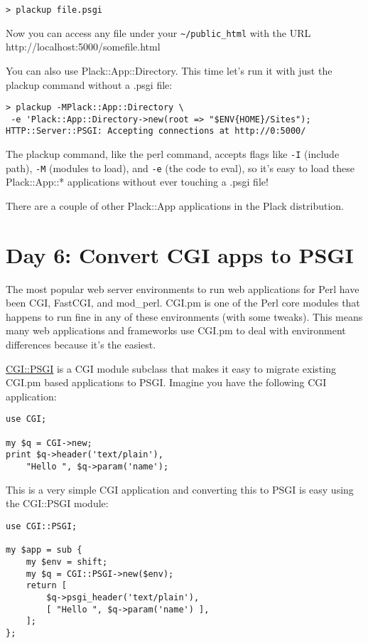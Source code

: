 \begin{lstlisting}
> plackup file.psgi
\end{lstlisting}

Now you can access any file under your \lstinline!~/public_html! with
the URL http://localhost:5000/somefile.html

You can also use Plack::App::Directory. This time let's run it with just
the plackup command without a .psgi file:

\begin{lstlisting}
> plackup -MPlack::App::Directory \
 -e 'Plack::App::Directory->new(root => "$ENV{HOME}/Sites");
HTTP::Server::PSGI: Accepting connections at http://0:5000/
\end{lstlisting}

The plackup command, like the perl command, accepts flags like
\lstinline!-I! (include path), \lstinline!-M! (modules to load), and
\lstinline!-e! (the code to eval), so it's easy to load these
Plack::App::* applications without ever touching a .psgi file!

There are a couple of other Plack::App applications in the Plack
distribution.

\chapter{Day 6: Convert CGI apps to
PSGI}\label{day-6-convert-cgi-apps-to-psgi}

The most popular web server environments to run web applications for
Perl have been CGI, FastCGI, and mod\_perl. CGI.pm is one of the Perl
core modules that happens to run fine in any of these environments (with
some tweaks). This means many web applications and frameworks use CGI.pm
to deal with environment differences because it's the easiest.

\href{http://search.cpan.org/perldoc?CGI::PSGI}{CGI::PSGI} is a CGI
module subclass that makes it easy to migrate existing CGI.pm based
applications to PSGI. Imagine you have the following CGI application:

\begin{lstlisting}
use CGI;

my $q = CGI->new;
print $q->header('text/plain'),
    "Hello ", $q->param('name');
\end{lstlisting}

This is a very simple CGI application and converting this to PSGI is
easy using the CGI::PSGI module:

\begin{lstlisting}
use CGI::PSGI;

my $app = sub {
    my $env = shift;
    my $q = CGI::PSGI->new($env);
    return [
        $q->psgi_header('text/plain'),
        [ "Hello ", $q->param('name') ],
    ];
};
\end{lstlisting}

